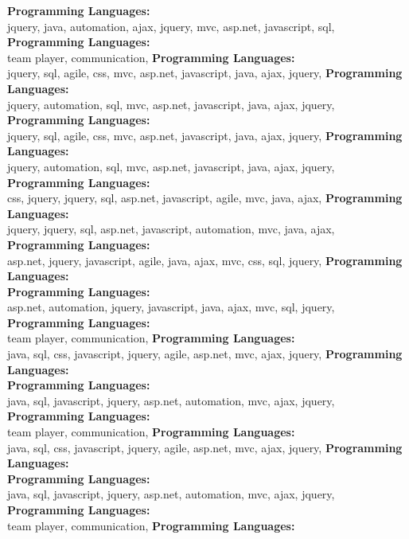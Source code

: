 \textbf{Programming Languages:} \\
 jquery, java, automation, ajax, jquery, mvc, asp.net, javascript, sql, \textbf{Programming Languages:} \\
team player,  communication, \textbf{Programming Languages:} \\
 jquery, sql, agile, css, mvc, asp.net, javascript, java, ajax, jquery, \textbf{Programming Languages:} \\
 jquery, automation, sql, mvc, asp.net, javascript, java, ajax, jquery, \textbf{Programming Languages:} \\
 jquery, sql, agile, css, mvc, asp.net, javascript, java, ajax, jquery, \textbf{Programming Languages:} \\
 jquery, automation, sql, mvc, asp.net, javascript, java, ajax, jquery, \textbf{Programming Languages:} \\
css,  jquery, jquery, sql, asp.net, javascript, agile, mvc, java, ajax, \textbf{Programming Languages:} \\
 jquery, jquery, sql, asp.net, javascript, automation, mvc, java, ajax, \textbf{Programming Languages:} \\
asp.net,  jquery, javascript, agile, java, ajax, mvc, css, sql, jquery, \textbf{Programming Languages:} \\
\textbf{Programming Languages:} \\
asp.net, automation,  jquery, javascript, java, ajax, mvc, sql, jquery, \textbf{Programming Languages:} \\
team player,  communication, \textbf{Programming Languages:} \\
java, sql, css, javascript,  jquery, agile, asp.net, mvc, ajax, jquery, \textbf{Programming Languages:} \\
\textbf{Programming Languages:} \\
java, sql, javascript,  jquery, asp.net, automation, mvc, ajax, jquery, \textbf{Programming Languages:} \\
team player,  communication, \textbf{Programming Languages:} \\
java, sql, css, javascript,  jquery, agile, asp.net, mvc, ajax, jquery, \textbf{Programming Languages:} \\
\textbf{Programming Languages:} \\
java, sql, javascript,  jquery, asp.net, automation, mvc, ajax, jquery, \textbf{Programming Languages:} \\
team player,  communication, \textbf{Programming Languages:} \\
